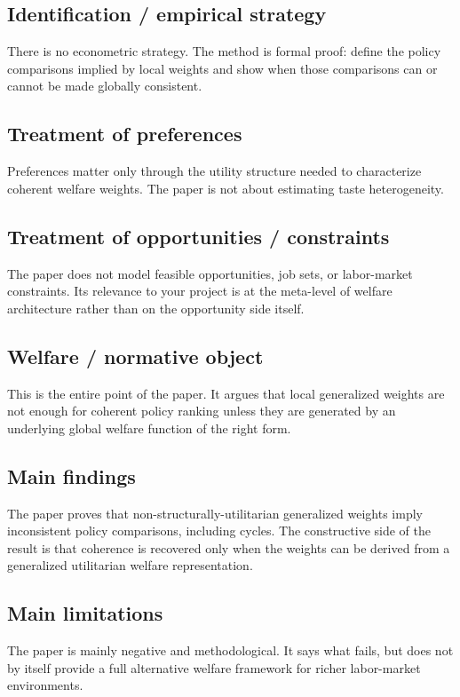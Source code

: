 \documentclass[11pt,a4paper]{article}
\begin{document}
\subsection*{Identification / empirical strategy}
There is no econometric strategy. The method is formal proof: define the policy comparisons implied by local weights and show when those comparisons can or cannot be made globally consistent.

\subsection*{Treatment of preferences}
Preferences matter only through the utility structure needed to characterize coherent welfare weights. The paper is not about estimating taste heterogeneity.

\subsection*{Treatment of opportunities / constraints}
The paper does not model feasible opportunities, job sets, or labor-market constraints. Its relevance to your project is at the meta-level of welfare architecture rather than on the opportunity side itself.

\subsection*{Welfare / normative object}
This is the entire point of the paper. It argues that local generalized weights are not enough for coherent policy ranking unless they are generated by an underlying global welfare function of the right form.

\subsection*{Main findings}
The paper proves that non-structurally-utilitarian generalized weights imply inconsistent policy comparisons, including cycles. The constructive side of the result is that coherence is recovered only when the weights can be derived from a generalized utilitarian welfare representation.

\subsection*{Main limitations}
The paper is mainly negative and methodological. It says what fails, but does not by itself provide a full alternative welfare framework for richer labor-market environments.
\end{document}
